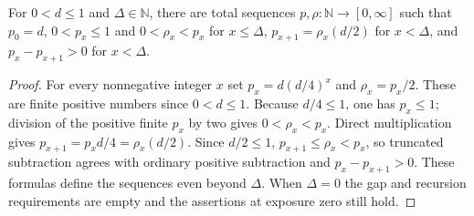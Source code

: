 \begin{lemma}
For $0<d\leq1$ and $\Delta\in\mathbb N$, there are total sequences
$p,\rho:\mathbb N\to[0,\infty]$ such that $p_0=d$,
$0<p_x\leq1$ and $0<\rho_x<p_x$ for $x\leq\Delta$,
$p_{x+1}=\rho_x(d/2)$ for $x<\Delta$, and
$p_x-p_{x+1}>0$ for $x<\Delta$.
\end{lemma}
\begin{proof}
For every nonnegative integer $x$ set $p_x=d(d/4)^x$ and
$\rho_x=p_x/2$. These are finite positive numbers since $0<d\leq1$.
Because $d/4\leq1$, one has $p_x\leq1$; division of the positive finite
$p_x$ by two gives $0<\rho_x<p_x$. Direct multiplication gives
$p_{x+1}=p_xd/4=\rho_x(d/2)$. Since $d/2\leq1$,
$p_{x+1}\leq\rho_x<p_x$, so truncated subtraction agrees with ordinary
positive subtraction and $p_x-p_{x+1}>0$. These formulas define the
sequences even beyond $\Delta$. When $\Delta=0$ the gap and recursion
requirements are empty and the assertions at exposure zero still hold.
\end{proof}
